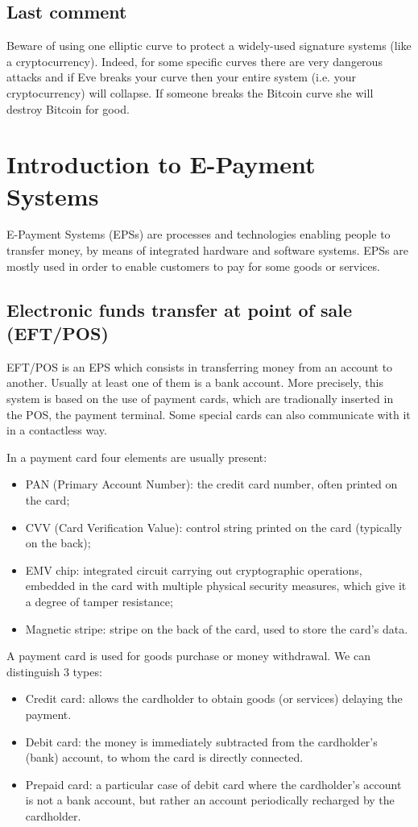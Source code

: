 \documentclass[a4paper, 10pt, titlepage]{article}
\begin{document}
\subsection*{Last comment}
Beware of using one elliptic curve to protect a widely-used signature systems (like a cryptocurrency).
Indeed, for some specific curves there are very dangerous attacks and if Eve breaks your curve then your entire system (i.e. your cryptocurrency) will collapse. If someone breaks the Bitcoin curve she will destroy Bitcoin for good.

\newpage
\section{Introduction to E-Payment Systems}
E-Payment Systems (EPSs) are processes and technologies enabling people to transfer money, by means of integrated hardware and software systems. EPSs are mostly used in order to enable customers to pay for some goods or services.
\subsection{Electronic funds transfer at point of sale (EFT/POS)}
EFT/POS is an EPS which consists in transferring money from an account to another. Usually at least one of them is a bank account. More precisely, this system is based on the use of payment cards, which are tradionally inserted in the POS, the payment terminal.
Some special cards can also communicate with it in a contactless way.

In a payment card four elements are usually present:
\begin{itemize}
\item PAN (Primary Account Number): the credit card number, often printed on the card;
\item CVV (Card Verification Value): control string printed on the card (typically on the back);
\item EMV chip: integrated circuit carrying out cryptographic operations, embedded in the card with multiple physical security measures, which give it a degree of tamper resistance;
\item Magnetic stripe: stripe on the back of the card, used to store the card's data.
\end{itemize}
A payment card is used for goods purchase or money withdrawal. We can distinguish 3 types:
\begin{itemize}
\item Credit card: allows the cardholder to obtain goods (or services) delaying the payment.
\item Debit card: the money is immediately subtracted from the cardholder's (bank) account, to whom the card is directly connected.
\item Prepaid card: a particular case of debit card where the cardholder's account is not a bank account, but rather an account periodically recharged by the cardholder.
\end{itemize} 
\end{document}
